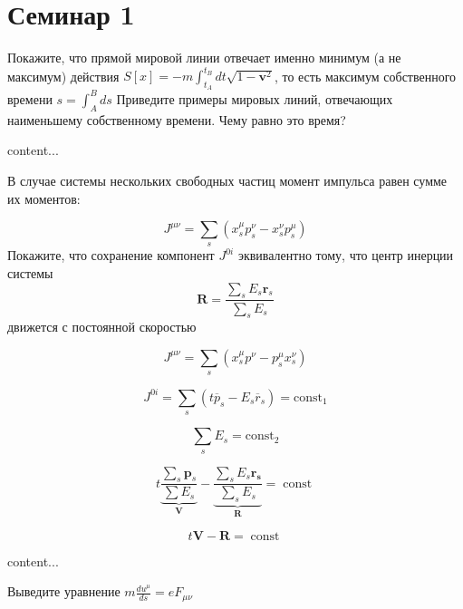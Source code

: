 
\section{Семинар 1}

\begin{problem}
	Покажите, что прямой мировой линии отвечает именно минимум (а не максимум) действия $S[x]=-m \int_{t_{A}}^{t_{B}} d t \sqrt{1-\boldsymbol{v}^{2}}$,
	то есть максимум собственного времени $s=\int_{A}^{B} d s$ Приведите примеры мировых линий, отвечающих
	наименьшему собственному времени. Чему равно это время?
\end{problem}	

\begin{solution}
	content...
\end{solution}




\begin{problem}
В случае системы нескольких свободных частиц момент импульса равен сумме их моментов:

$$
J^{\mu \nu}=\sum_{s}\left(x_{s}^{\mu} p_{s}^{\nu}-x_{s}^{\nu} p_{s}^{\mu}\right)
$$
Покажите, что сохранение компонент $ J^{0 i} $ 
эквивалентно тому, что центр инерции системы
$$
\boldsymbol{R}=\frac{\sum_{s} E_{s} \boldsymbol{r}_{s}}{\sum_{s} E_{s}}
$$
движется с постоянной скоростью
\end{problem}
\begin{solution}
	$$
	J^{\mu \nu}=\sum_{s}\left(x_{s}^{\mu} p^{\nu}-p_{s}^{\mu} x_{s}^{\nu}\right)
	$$
	
	$$
	J^{0 i}=\sum_{s}\left(t \overline{p}_{s}-E_{s} \overline{r}_{s}\right)=\operatorname{const_1}
	$$
	
	$$
	\sum_{s} E_{s}=\operatorname{const_2}
	$$
	
	$$
	t \underbrace{\frac{\sum_{s} \boldsymbol{p}_{s}}{\sum E_{s}}}_{\boldsymbol{V}}-\underbrace{\frac{\sum_{s} E_{s} \boldsymbol{r_{s}}}{\sum_s E_{s}}}_{\boldsymbol{R}}= \operatorname{const}
	$$
	
	
	$$
	t \boldsymbol{V}-\boldsymbol{R}=\operatorname{const}
	$$
	
\end{solution}
\begin{problem}
	content...
\end{problem}



\begin{problem}
	Выведите уравнение $ m \frac{d u^{\mu}}{d s} = e F_{\mu \nu}$
	
\end{problem}	


